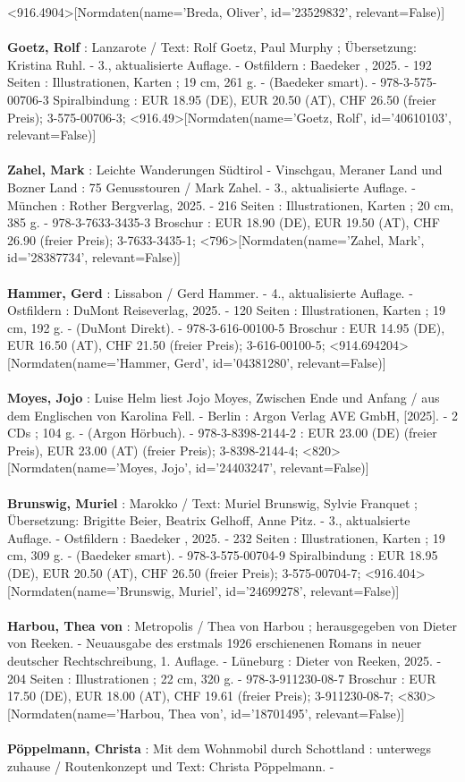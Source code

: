 \documentclass{article}
\begin{document}
\begin{multicols}{3}
<916.4904>[Normdaten(name='Breda, Oliver', id='23529832', relevant=False)]\\\\\textbf{Goetz, Rolf} : Lanzarote / Text: Rolf Goetz, Paul Murphy ; Übersetzung: Kristina Ruhl. - 3., aktualisierte Auflage. - Ostfildern : Baedeker , 2025. - 192 Seiten : Illustrationen, Karten ; 19 cm, 261 g. - (Baedeker smart). - 978-3-575-00706-3 Spiralbindung : EUR 18.95 (DE), EUR 20.50 (AT), CHF 26.50 (freier Preis); 3-575-00706-3; <916.49>[Normdaten(name='Goetz, Rolf', id='40610103', relevant=False)]\\\\\textbf{Zahel, Mark} : Leichte Wanderungen Südtirol - Vinschgau, Meraner Land und Bozner Land : 75 Genusstouren  / Mark Zahel. - 3., aktualisierte Auflage. - München : Rother Bergverlag, 2025. - 216 Seiten : Illustrationen, Karten ; 20 cm, 385 g. - 978-3-7633-3435-3 Broschur : EUR 18.90 (DE), EUR 19.50 (AT), CHF 26.90 (freier Preis); 3-7633-3435-1; <796>[Normdaten(name='Zahel, Mark', id='28387734', relevant=False)]\\\\\textbf{Hammer, Gerd} : Lissabon / Gerd Hammer. - 4., aktualisierte Auflage. - Ostfildern : DuMont Reiseverlag, 2025. - 120 Seiten : Illustrationen, Karten ; 19 cm, 192 g. - (DuMont Direkt). - 978-3-616-00100-5 Broschur : EUR 14.95 (DE), EUR 16.50 (AT), CHF 21.50 (freier Preis); 3-616-00100-5; <914.694204>[Normdaten(name='Hammer, Gerd', id='04381280', relevant=False)]\\\\\textbf{Moyes, Jojo} : Luise Helm liest Jojo Moyes, Zwischen Ende und Anfang / aus dem Englischen von Karolina Fell. - Berlin : Argon Verlag AVE GmbH, [2025]. - 2 CDs ; 104 g. - (Argon Hörbuch). - 978-3-8398-2144-2 : EUR 23.00 (DE) (freier Preis), EUR 23.00 (AT) (freier Preis); 3-8398-2144-4; <820>[Normdaten(name='Moyes, Jojo', id='24403247', relevant=False)]\\\\\textbf{Brunswig, Muriel} : Marokko / Text: Muriel Brunswig, Sylvie Franquet ; Übersetzung: Brigitte Beier, Beatrix Gelhoff, Anne Pitz. - 3., aktualsierte  Auflage. - Ostfildern : Baedeker , 2025. - 232 Seiten : Illustrationen, Karten ; 19 cm, 309 g. - (Baedeker smart). - 978-3-575-00704-9 Spiralbindung : EUR 18.95 (DE), EUR 20.50 (AT), CHF 26.50 (freier Preis); 3-575-00704-7; <916.404>[Normdaten(name='Brunswig, Muriel', id='24699278', relevant=False)]\\\\\textbf{Harbou, Thea von} : Metropolis / Thea von Harbou ; herausgegeben von Dieter von Reeken. - Neuausgabe des erstmals 1926 erschienenen Romans in neuer deutscher Rechtschreibung, 1. Auflage. - Lüneburg : Dieter von Reeken, 2025. - 204 Seiten : Illustrationen ; 22 cm, 320 g. - 978-3-911230-08-7 Broschur : EUR 17.50 (DE), EUR 18.00 (AT), CHF 19.61 (freier Preis); 3-911230-08-7; <830>[Normdaten(name='Harbou, Thea von', id='18701495', relevant=False)]\\\\\textbf{Pöppelmann, Christa} : Mit dem Wohnmobil durch Schottland : unterwegs zuhause / Routenkonzept und Text: Christa Pöppelmann. - 
\end{multicols}
\end{document}
